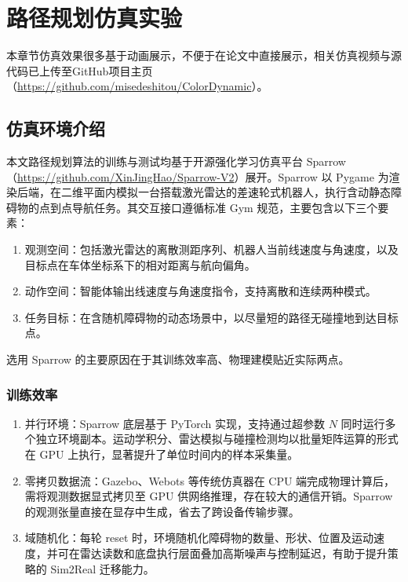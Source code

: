 \chapter{路径规划仿真实验}\label{chap:path_planning_simulation}
本章节仿真效果很多基于动画展示，不便于在论文中直接展示，相关仿真视频与源代码已上传至GitHub项目主页（\url{https://github.com/misedeshitou/ColorDynamic}）。

\section{仿真环境介绍}
本文路径规划算法的训练与测试均基于开源强化学习仿真平台 Sparrow（\url{https://github.com/XinJingHao/Sparrow-V2}）展开。\cite{Color}Sparrow 以 Pygame 为渲染后端，在二维平面内模拟一台搭载激光雷达的差速轮式机器人，执行含动静态障碍物的点到点导航任务。其交互接口遵循标准 Gym 规范，主要包含以下三个要素：

\begin{enumerate}
    \item 观测空间：包括激光雷达的离散测距序列、机器人当前线速度与角速度，以及目标点在车体坐标系下的相对距离与航向偏角。
    \item 动作空间：智能体输出线速度与角速度指令，支持离散和连续两种模式。
    \item 任务目标：在含随机障碍物的动态场景中，以尽量短的路径无碰撞地到达目标点。
\end{enumerate}

选用 Sparrow 的主要原因在于其训练效率高、物理建模贴近实际两点。

\subsection{训练效率}

\begin{enumerate}
\item 并行环境：Sparrow 底层基于 PyTorch 实现，支持通过超参数 $N$ 同时运行多个独立环境副本。运动学积分、雷达模拟与碰撞检测均以批量矩阵运算的形式在 GPU 上执行，显著提升了单位时间内的样本采集量。
\item 零拷贝数据流：Gazebo、Webots 等传统仿真器在 CPU 端完成物理计算后，需将观测数据显式拷贝至 GPU 供网络推理，存在较大的通信开销。Sparrow 的观测张量直接在显存中生成，省去了跨设备传输步骤。
\item 域随机化：每轮 reset 时，环境随机化障碍物的数量、形状、位置及运动速度，并可在雷达读数和底盘执行层面叠加高斯噪声与控制延迟，有助于提升策略的 Sim2Real 迁移能力。
\end{enumerate}


